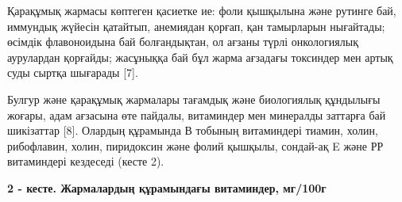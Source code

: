 
Қарақұмық жармасы көптеген қасиетке ие: фоли қышқылына және рутинге бай,
иммундық жүйесін қатайтып, анемиядан қорғап, қан тамырларын нығайтады;
өсімдік флавоноидына бай болғандықтан, ол ағзаны түрлі онкологиялық
аурулардан қорғайды; жасұныққа бай бұл жарма ағзадағы токсиндер мен
артық суды сыртқа шығарады {[}7{]}.

Булгур және қарақұмық жармалары тағамдық және биологиялық құндылығы
жоғары, адам ағзасына өте пайдалы, витаминдер мен минералды заттарға бай
шикізаттар {[}8{]}. Олардың құрамында В тобының витаминдері тиамин,
холин, рибофлавин, холин, пиридоксин және фолий қышқылы, сондай-ақ E
және РР витаминдері кездеседі (кесте 2).

{\bfseries 2 - кесте. Жармалардың құрамындағы витаминдер, мг/100г}

